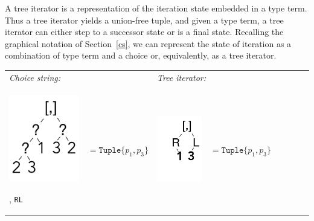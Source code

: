 \documentclass[a4paper,english]{lipics-v2019}
\newcommand{\xt}[1]{\texttt{#1}}
\renewcommand{\L}{{\tt L}\xspace}
\newcommand{\R}{{\tt R}\xspace}
\newcommand{\tuple}[1]{\xt{Tuple\{}#1\xt{\}}}
\begin{document}
A tree iterator is a representation of the iteration state embedded in a
type term. Thus a tree iterator yields a union-free tuple, and given a type
term, a tree iterator can either step to a successor state or is a final
state. Recalling the graphical notation of Section~\ref{cs}, we can
represent the state of iteration as a combination of type term and a choice
or, equivalently, as a tree iterator.

\medskip
{\small
\begin{tabular}{@{}l@{~}ll@{~}ll@{~}ll@{~}l}
\it Choice string: &&  \multicolumn{2}{l}{\it Tree iterator:}\\[2mm]
\begin{minipage}{1.2cm}\includegraphics[scale=.25]{figures/tree1.pdf} 
\end{minipage} , \R\L & $ =   \tuple{p_1,p_3} $ 
&\begin{minipage}{1.2cm}\includegraphics[scale=.25]{figures/tree8.pdf}
\end{minipage}& $=\tuple{p_1,p_3}$
\end{tabular}}
\end{document}
